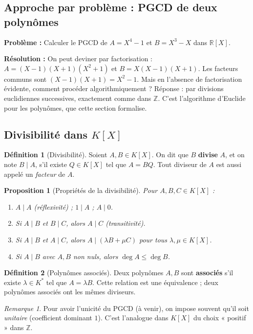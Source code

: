 \documentclass[12pt,a4paper]{report}
\newtheorem{proposition}[theoreme]{Proposition}
\theoremstyle{definition}
\newtheorem{definition}{Définition}[section]
\theoremstyle{remark}
\newtheorem{remarque}{Remarque}[section]
\begin{document}
\subsection{Approche par problème : PGCD de deux polynômes}
\textbf{Problème :} Calculer le PGCD de $A = X^4 - 1$ et $B = X^3 - X$ dans $\mathbb{R}[X]$.

\textbf{Résolution :} On peut deviner par factorisation : $A = (X-1)(X+1)(X^2+1)$ et $B = X(X-1)(X+1)$. Les facteurs communs sont $(X-1)(X+1) = X^2 - 1$. Mais en l'absence de factorisation évidente, comment procéder algorithmiquement ? Réponse : par divisions euclidiennes successives, exactement comme dans $\mathbb{Z}$. C'est l'algorithme d'Euclide pour les polynômes, que cette section formalise.

\subsection{Divisibilité dans $K[X]$}

\begin{definition}[Divisibilité]
Soient $A, B \in K[X]$. On dit que $B$ \textbf{divise} $A$, et on note $B \mid A$, s'il existe $Q \in K[X]$ tel que $A = B Q$. Tout diviseur de $A$ est aussi appelé un \emph{facteur} de $A$.
\end{definition}

\begin{proposition}[Propriétés de la divisibilité]
Pour $A, B, C \in K[X]$ :
\begin{enumerate}
    \item $A \mid A$ (réflexivité) ; $1 \mid A$ ; $A \mid 0$.
    \item Si $A \mid B$ et $B \mid C$, alors $A \mid C$ (transitivité).
    \item Si $A \mid B$ et $A \mid C$, alors $A \mid (\lambda B + \mu C)$ pour tous $\lambda, \mu \in K[X]$.
    \item Si $A \mid B$ avec $A, B$ non nuls, alors $\deg A \le \deg B$.
\end{enumerate}
\end{proposition}

\begin{definition}[Polynômes associés]
Deux polynômes $A, B$ sont \textbf{associés} s'il existe $\lambda \in K^*$ tel que $A = \lambda B$. Cette relation est une équivalence ; deux polynômes associés ont les mêmes diviseurs.
\end{definition}

\begin{remarque}
Pour avoir l'unicité du PGCD (à venir), on impose souvent qu'il soit \emph{unitaire} (coefficient dominant $1$). C'est l'analogue dans $K[X]$ du choix « positif » dans $\mathbb{Z}$.
\end{remarque}
\end{document}
